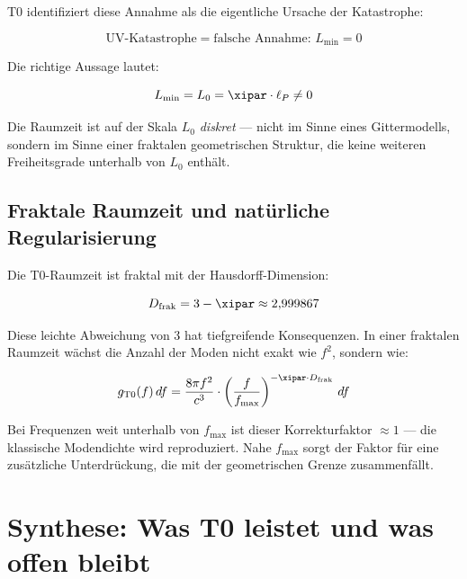 T0 identifiziert diese Annahme als die eigentliche Ursache der Katastrophe:

\begin{equation}
    \text{UV-Katastrophe} = \text{falsche Annahme: } L_{\min} = 0
\end{equation}

Die richtige Aussage lautet:

\begin{equation}
    L_{\min} = L_0 = \xipar \cdot \ell_P \neq 0
\end{equation}

Die Raumzeit ist auf der Skala $L_0$ \emph{diskret} — nicht im Sinne eines 
Gittermodells, sondern im Sinne einer fraktalen geometrischen Struktur, die keine 
weiteren Freiheitsgrade unterhalb von $L_0$ enthält.

\subsection{Fraktale Raumzeit und natürliche Regularisierung}

Die T0-Raumzeit ist fraktal mit der Hausdorff-Dimension:

\begin{equation}
    D_{\text{frak}} = 3 - \xipar \approx 2{,}999867
    \label{eq:fractal_dim}
\end{equation}

Diese leichte Abweichung von 3 hat tiefgreifende Konsequenzen. In einer fraktalen 
Raumzeit wächst die Anzahl der Moden nicht exakt wie $f^2$, sondern wie:

\begin{equation}
    g_{\text{T0}}(f) \, df = \frac{8\pi f^2}{c^3} \cdot \left(\frac{f}{f_{\max}}\right)^{-\xipar \cdot D_{\text{frak}}} \, df
    \label{eq:t0_mode_density}
\end{equation}

Bei Frequenzen weit unterhalb von $f_{\max}$ ist dieser Korrekturfaktor 
$\approx 1$ — die klassische Modendichte wird reproduziert. Nahe $f_{\max}$ 
sorgt der Faktor für eine zusätzliche Unterdrückung, die mit der geometrischen 
Grenze zusammenfällt.

\clearpage

\section{Synthese: Was T0 leistet und was offen bleibt}
\label{sec:synthesis}

